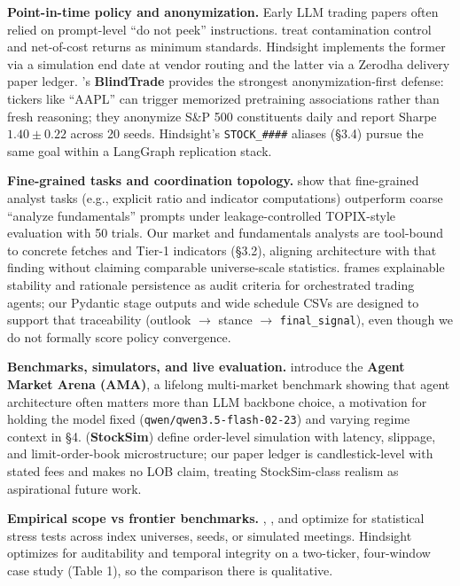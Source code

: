 \documentclass{article}
\begin{document}
\textbf{Point-in-time policy and anonymization.} Early LLM trading
papers often relied on prompt-level ``do not peek'' instructions. \citet{nguyen2026toward} treat contamination control and
net-of-cost returns as minimum standards. Hindsight implements
the former via a simulation end date at vendor routing
 and the latter via a Zerodha delivery paper
ledger. \citeauthor{jeon2026blindtrade}'s \textbf{BlindTrade} \citeyearpar{jeon2026blindtrade} provides the strongest
anonymization-first defense: tickers like ``AAPL'' can trigger memorized
pretraining associations rather than fresh reasoning; they anonymize
S\&P 500 constituents daily and report Sharpe $1.40 \pm 0.22$ across
20 seeds. Hindsight's \texttt{STOCK\_\#\#\#\#} aliases (§3.4) pursue the same goal within a LangGraph replication stack.

\textbf{Fine-grained tasks and coordination topology.}
\citet{miyazaki2026expert} show that fine-grained analyst tasks (e.g., explicit
ratio and indicator computations) outperform coarse ``analyze
fundamentals'' prompts under leakage-controlled TOPIX-style evaluation
with 50 trials. Our market and fundamentals analysts are
tool-bound to concrete fetches and Tier-1 indicators
(§3.2), aligning architecture with that finding without claiming
comparable universe-scale statistics. \citet{dewansh2026policy} frames
explainable stability and rationale persistence as
audit criteria for orchestrated trading agents; our Pydantic stage
outputs and wide schedule CSVs are designed to support that traceability
(outlook $\rightarrow$ stance $\rightarrow$ \texttt{final\_signal}), even though we do not
formally score policy convergence.

\textbf{Benchmarks, simulators, and live evaluation.} \citet{qian2025agent}
introduce the \textbf{Agent Market Arena (AMA)}, a lifelong multi-market
benchmark showing that agent architecture often matters more
than LLM backbone choice, a motivation for holding the model fixed
(\texttt{qwen/qwen3.5-flash-02-23}) and varying regime context in §4.
\citet{papadakis2025stocksim} (\textbf{StockSim}) define order-level
simulation with latency, slippage, and limit-order-book microstructure;
our paper ledger is candlestick-level with stated fees and makes no
LOB claim, treating StockSim-class realism as aspirational future work.

\textbf{Empirical scope vs frontier benchmarks.} \citet{jeon2026blindtrade},
\citet{li2025quantagents}, and \citet{miyazaki2026expert} optimize for
statistical stress tests across index universes, seeds, or
simulated meetings. Hindsight optimizes for auditability and
temporal integrity on a two-ticker, four-window case study (Table 1),
so the comparison there is qualitative.
\end{document}
